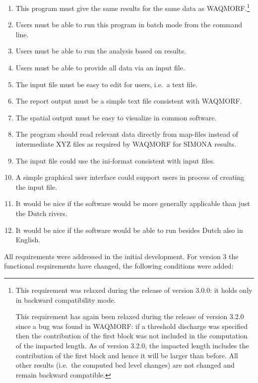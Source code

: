 \begin{enumerate}
\item This program must give the same results for the same data as WAQMORF.\footnote{This requirement was relaxed during the release of \dfmi version 3.0.0: it holds only in backward compatibility mode.
	
This requirement has again been relaxed during the release of \dfmi version 3.2.0 since a bug was found in WAQMORF: if a threshold discharge was specified then the contribution of the first block was not included in the computation of the impacted length.
As of version 3.2.0, the impacted length includes the contribution of the first block and hence it will be larger than before.
All other results (i.e.\ the computed bed level changes) are not changed and remain backward compatible.}
\item Users must be able to run this program in batch mode from the command line.
\item Users must be able to run the analysis based on \dflowfm results.
\item Users must be able to provide all data via an input file.
\item The input file must be easy to edit for users, i.e.~a text file.
\item The report output must be a simple text file consistent with WAQMORF.
\item The spatial output must be easy to visualize in common software.

\item The program should read relevant data directly from \dflowfm map-files instead of intermediate XYZ files as required by WAQMORF for SIMONA results.

\item The input file could use the ini-format consistent with \dflowfm input files.
\item A simple graphical user interface could support users in process of creating the input file.

\item It would be nice if the software would be more generally applicable than just the Dutch rivers.
\item It would be nice if the software would be able to run besides Dutch also in English.
\end{enumerate}

All requirements were addressed in the initial development.
For \dfastmi version 3 the functional requirements have changed, the following conditions were added:

